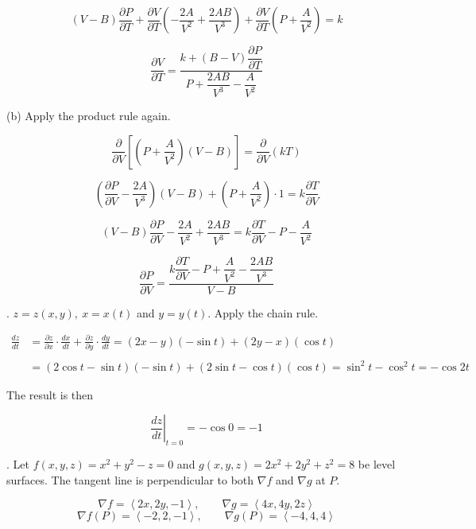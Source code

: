 \documentclass{article}
\begin{document}
\[(V-B)\frac{\partial P}{\partial T}+\frac{\partial V}{\partial T}\left(-\frac{2A}{V^2}+\frac{2AB}{V^3}\right)+\frac{\partial V}{\partial T}\left(P+\frac{A}{V^2}\right)=k\]

\[\boxed{\frac{\partial V}{\partial T}=\frac{k+(B-V)\dfrac{\partial P}{\partial T}}{P+\dfrac{2AB}{V^3}-\dfrac{A}{V^2}}}\]

\hfill

\noindent (b) Apply the product rule again.

\[\frac\partial{\partial V}\left[\left(P+\frac A{V^2}\right)(V-B)\right]=\frac\partial{\partial V}\left(kT\right)\]

\[\left(\frac{\partial P}{\partial V}-\frac{2A}{V^3}\right)(V-B)+\left(P+\frac A{V^2}\right)\cdot1=k\frac{\partial T}{\partial V}\]

\[(V-B)\frac{\partial P}{\partial V}-\frac{2A}{V^2}+\frac{2AB}{V^3}=k\frac{\partial T}{\partial V}-P-\frac A{V^2}\]

\[\boxed{\frac{\partial P}{\partial V}=\frac{k\dfrac{\partial T}{\partial V}-P+\dfrac A{V^2}-\dfrac{2AB}{V^3}}{V-B}}\]

\hfill

. $z=z(x,y),\:x=x(t)$ and $y=y(t)$. Apply the chain rule.

\begin{align*}\frac{dz}{dt}&=\frac{\partial z}{\partial x}\cdot\frac{dx}{dt}+\frac{\partial z}{\partial y}\cdot\frac{dy}{dt}=(2x-y)(-\sin t)+(2y-x)(\cos t)\\\\&=(2\cos t-\sin t)(-\sin t)+(2\sin t-\cos t)(\cos t)=\sin^2t-\cos^2t=-\cos2t\end{align*}

\hfill

\noindent The result is then

\[\left.\frac{dz}{dt}\right|_{t=0}=-\cos0=\boxed{-1}\]

\hfill

. Let $f(x,y,z)=x^2+y^2-z=0$ and $g(x,y,z)=2x^2+2y^2+z^2=8$ be level surfaces. The tangent line is perpendicular to both $\nabla f$ and $\nabla g$ at $P$.

\[\nabla f=\left\langle2x,2y,-1\right\rangle,\qquad\nabla g=\left\langle4x,4y,2z\right\rangle\]
\[\nabla f(P)=\left\langle-2,2,-1\right\rangle,\qquad\nabla g(P)=\left\langle-4,4,4\right\rangle\]
\end{document}
